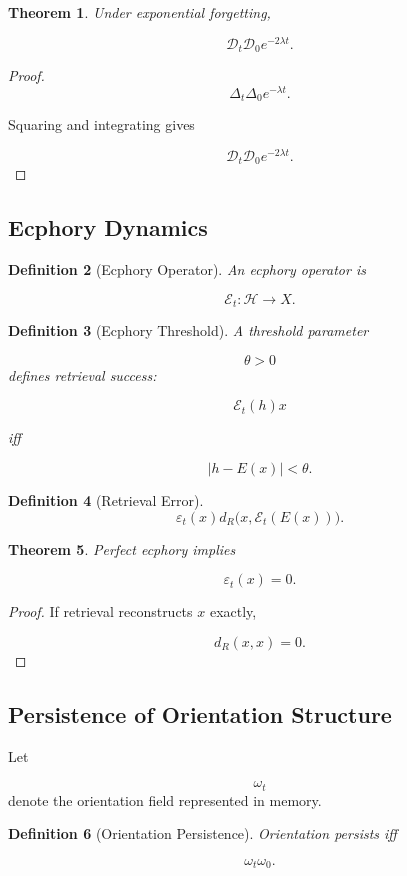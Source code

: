 \documentclass[12pt]{article}
\newtheorem{theorem}{Theorem}[section]
\newtheorem{definition}[theorem]{Definition}
\theoremstyle{remark}
\begin{document}
\begin{theorem}
Under exponential forgetting,

\[
\mathcal D_t
\mathcal D_0 e^{-2\lambda t}.
\]
\end{theorem}

\begin{proof}
\[
\Delta_t
\Delta_0 e^{-\lambda t}.
\]

Squaring and integrating gives

\[
\mathcal D_t
\mathcal D_0 e^{-2\lambda t}.
\]
\end{proof}

\subsection{Ecphory Dynamics}

\begin{definition}[Ecphory Operator]
An ecphory operator is

\[
\mathcal E_t:\mathcal H\rightarrow X.
\]
\end{definition}
\begin{definition}[Ecphory Threshold]
A threshold parameter

\[
\theta>0
\]
defines retrieval success:

\[
\mathcal E_t(h)
x
\]

iff

\[
|h-E(x)|
<
\theta.
\]
\end{definition}
\begin{definition}[Retrieval Error]
\[
\varepsilon_t(x)
d_R
\big(
x,\mathcal E_t(E(x))
\big).
\]
\end{definition}

\begin{theorem}
Perfect ecphory implies

\[
\varepsilon_t(x)=0.
\]
\end{theorem}
\begin{proof}
If retrieval reconstructs \(x\) exactly,

\[
d_R(x,x)=0.
\]
\end{proof}
\subsection{Persistence of Orientation Structure}

Let

\[
\omega_t
\]
denote the orientation field represented in memory.

\begin{definition}[Orientation Persistence]
Orientation persists iff

\[
\omega_t
\omega_0.
\]
\end{definition}
\end{document}
